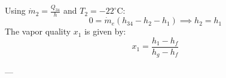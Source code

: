 Using \( \dot{m}_2 = \frac{Q_{34}}{h} \) and \( T_2 = -22^\circ\text{C} \):  
\[
0 = \dot{m}_e \left( h_{34} - h_2 - h_1 \right) \implies h_2 = h_1
\]  
The vapor quality \( x_1 \) is given by:  
\[
x_1 = \frac{h_1 - h_f}{h_g - h_f}
\]  

---